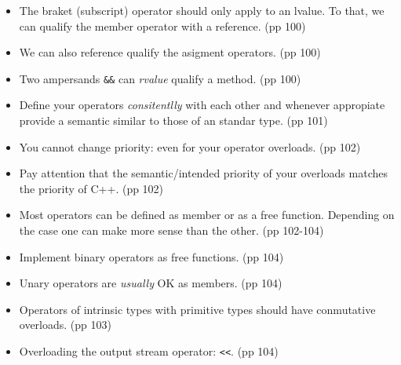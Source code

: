 \begin{itemize}
  \item The braket (subscript) operator should only apply to an lvalue. To that, we can qualify the member operator with a reference. (pp 100)
  \item We can also reference qualify the asigment operators. (pp 100)
  \item Two ampersands \texttt{&&} can \emph{rvalue} qualify a method. (pp 100)
  \item Define your operators \emph{consitentlly} with each other and whenever appropiate provide a semantic similar to those of an standar type. (pp 101)
  \item You cannot change priority: even for your operator overloads. (pp 102)
  \item Pay attention that the semantic/intended priority of your overloads matches the priority of C++. (pp 102)
  \item Most operators can be defined as member or as a free function. Depending on the case one can make more sense than the other. (pp 102-104)
  \item Implement binary operators as free functions. (pp 104)
  \item Unary operators are \emph{usually} OK as members. (pp 104)
  \item Operators of intrinsic types with primitive types should have conmutative overloads. (pp 103)
  \item Overloading the output stream operator: \texttt{<<}. (pp 104)
  
\end{itemize}

